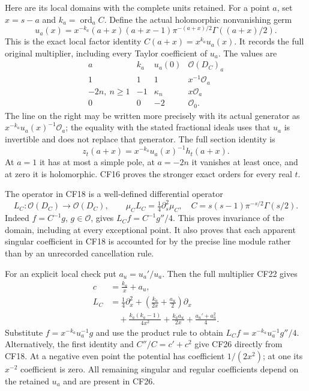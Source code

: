 Here are its local domains with the complete units
retained. For a point \(a\), set \(x=s-a\) and
\(k_a=\operatorname{ord}_a C\). Define the actual
holomorphic nonvanishing germ
\[
 u_a(x)=x^{-k_a}
       (a+x)(a+x-1)\pi^{-(a+x)/2}\Gamma((a+x)/2).
 \tag{CF22}
\]
This is the exact local factor identity \(C(a+x)=x^{k_a}u_a(x)\).
It records the full original multiplier, including every
Taylor coefficient of \(u_a\). The values are
\[
 \begin{array}{c|c|c|c}
 a&k_a&u_a(0)&\mathcal O(D_C)_a\\ \hline
 1&1&1&x^{-1}\mathcal O_a\\
 -2n,\ n\ge1&-1&\kappa_n&x\mathcal O_a\\
 0&0&-2&\mathcal O_0 .
 \end{array}\tag{CF23}
\]
The line on the right may be written more precisely with
its actual generator as \(x^{-k_a}u_a(x)^{-1}\mathcal O_a\);
the equality with the stated fractional ideals uses that
\(u_a\) is invertible and does not replace that generator.
The full section identity is
\[
 z_t(a+x)=x^{-k_a}u_a(x)^{-1}h_t(a+x).
 \tag{CF24}
\]
At \(a=1\) it has at most a simple pole, at \(a=-2n\)
it vanishes at least once, and at zero it is holomorphic.
CF16 proves the stronger exact orders for every real \(t\).

The operator in CF18 is a well-defined differential
operator
\[
 L_C:\mathcal O(D_C)\longrightarrow\mathcal O(D_C),
 \qquad \mu_C L_C=\tfrac14\partial_s^2\mu_C ,
 \quad C=s(s-1)\pi^{-s/2}\Gamma(s/2).
 \tag{CF25}
\]
Indeed \(f=C^{-1}g\), \(g\in\mathcal O\), gives
\(L_Cf=C^{-1}g''/4\). This proves invariance of the
domain, including at every exceptional point. It also
proves that each apparent singular coefficient in CF18
is accounted for by the precise line module rather
than by an unrecorded cancellation rule.

For an explicit local check put \(a_u=u_a'/u_a\).
Then the full multiplier CF22 gives
\[
 \begin{split}
 c&=\frac{k_a}{x}+a_u,\\
 L_C
 &=\frac14\partial_x^2+
      \left(\frac{k_a}{2x}+\frac{a_u}{2}\right)\partial_x\\
 &\quad+\frac{k_a(k_a-1)}{4x^2}
       +\frac{k_a a_u}{2x}
       +\frac{a_u'+a_u^2}{4}.
 \end{split}\tag{CF26}
\]
Substitute \(f=x^{-k_a}u_a^{-1}g\) and use the product
rule to obtain \(L_Cf=x^{-k_a}u_a^{-1}g''/4\).
Alternatively, the first identity and
\(C''/C=c'+c^2\) give CF26 directly from CF18.
At a negative even point the potential has coefficient
\(1/(2x^2)\); at one its \(x^{-2}\) coefficient is zero.
All remaining singular and regular coefficients depend
on the retained \(u_a\) and are present in CF26.

